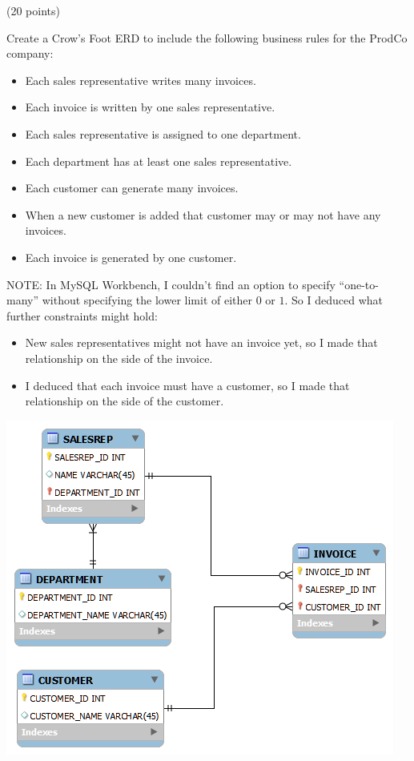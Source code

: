 \begin{problem}(20 points)
  
  \noindent
  Create a Crow’s Foot ERD to include the following business rules for the ProdCo company:
    \begin{itemize}
      \item Each sales representative writes many invoices.
      \item Each invoice is written by one sales representative.
      \item Each sales representative is assigned to one department.
      \item Each department has at least one sales representative.
      \item Each customer can generate many invoices.
      \item When a new customer is added that customer may or may not have any invoices.
      \item Each invoice is generated by one customer.
    \end{itemize}
\end{problem}
\begin{Answer}
  NOTE: In MySQL Workbench, I couldn't find an option
  to specify ``one-to-many'' without specifying the lower
  limit of either $0$ or $1$.
  So I deduced what further constraints might hold:
  
  \begin{itemize}
    \item New sales representatives might not have an invoice yet, so
    I made that relationship  on the side of the invoice.
    \item I deduced that each invoice must have a customer, so I made
    that relationship  on the side of the customer.
  \end{itemize}
  \bigskip
  \centering
  \includegraphics[scale=0.8]{erd.png}
\end{Answer}
